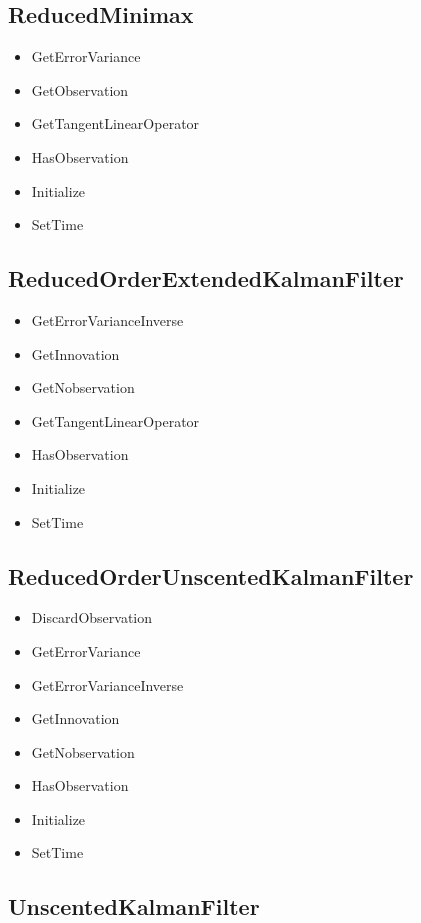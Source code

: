 \documentclass{tufte-book}
\begin{document}
\subsection{ReducedMinimax}

\begin{itemize}
\item GetErrorVariance
\item GetObservation
\item GetTangentLinearOperator
\item HasObservation
\item Initialize
\item SetTime
\end{itemize}

\subsection{ReducedOrderExtendedKalmanFilter}

\begin{itemize}
\item GetErrorVarianceInverse
\item GetInnovation
\item GetNobservation
\item GetTangentLinearOperator
\item HasObservation
\item Initialize
\item SetTime
\end{itemize}

\subsection{ReducedOrderUnscentedKalmanFilter}

\begin{itemize}
\item DiscardObservation
\item GetErrorVariance
\item GetErrorVarianceInverse
\item GetInnovation
\item GetNobservation
\item HasObservation
\item Initialize
\item SetTime
\end{itemize}

\subsection{UnscentedKalmanFilter}
\end{document}

